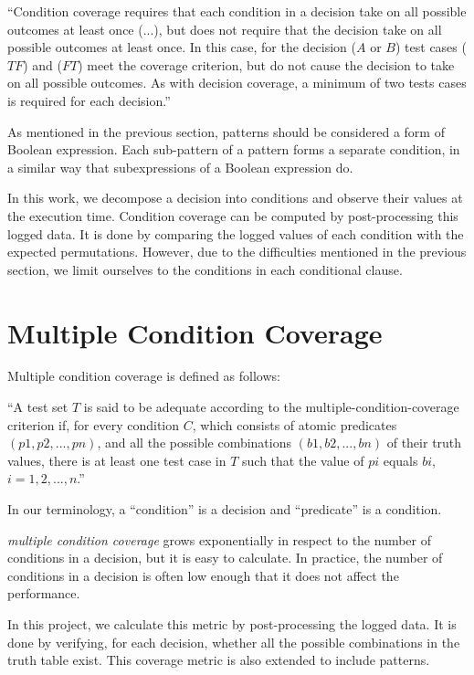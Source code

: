 \documentclass[12pt,a4paper]{report}
\begin{document}
``Condition coverage requires that each condition in a decision take on all possible outcomes at least once (...), but does not require that the decision take on all possible outcomes at least once. In this case, for the decision ($A$ or $B$) test cases ($TF$) and ($FT$) meet the coverage criterion, but do not cause the decision to take on all possible outcomes. As with decision coverage, a minimum of two tests cases is required for each decision.''\cite{KellyJ.:2001:PTM:886632}

As mentioned in the previous section, patterns should be considered a form of Boolean expression. Each sub-pattern of a pattern forms a separate condition, in a similar way that subexpressions of a Boolean expression do. 

In this work, we decompose a decision into conditions and observe their values at the execution time. Condition coverage can be computed by post-processing this logged data. It is done by comparing the logged values of each condition with the expected permutations. However, due to the difficulties mentioned in the previous section, we limit ourselves to the conditions in each conditional clause. 

\section{Multiple Condition Coverage}
Multiple condition coverage is defined as follows:

``A test set $T$ is said to be adequate according to the multiple-condition-coverage criterion if, for every condition $C$, which consists of atomic predicates $(p1, p2,  . . .  , pn)$, and all the possible combinations $(b1, b2,  . . .  , bn)$ of their truth values, there is at least one test case in $T$ such that the value of $pi$ equals $bi$, $i = 1, 2,  .  .  .  , n$.'' \cite{Zhu:1997:SUT:267580.267590}

In our terminology, a ``condition'' is a decision and ``predicate'' is a condition. 

\emph{multiple condition coverage} grows exponentially in respect to the number of conditions in a decision, but it is easy to calculate. In practice, the number of conditions in a decision is often low enough that it does not affect the performance.

In this project, we calculate this metric by post-processing the logged data. It is done by verifying, for each decision, whether all the possible combinations in the truth table exist. This coverage metric is also extended to include patterns.
\end{document}
